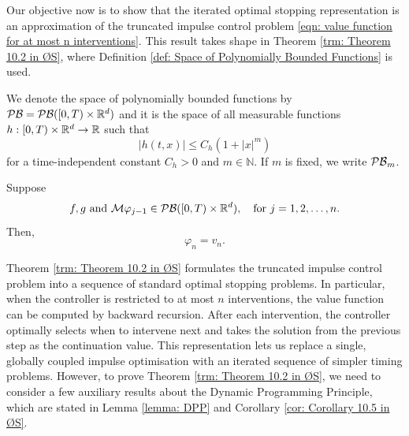 Our objective now is to show that the iterated optimal stopping representation is an approximation of the truncated impulse control problem \eqref{eqn: value function for at most n interventions}. This result takes shape in Theorem \ref{trm: Theorem 10.2 in ØS}, where Definition \ref{def: Space of Polynomially Bounded Functions} is used.

\begin{definition} 
\label{def: Space of Polynomially Bounded Functions}
    We denote the space of polynomially bounded functions by $\mathcal{PB} = \mathcal{PB}([0,T) \times \mathbb{R}^d)$ and it is the space of all measurable functions $h: [0,T) \times \mathbb{R}^d \rightarrow \mathbb{R}$ such that 
    \begin{equation*}
        |h(t,x)| \leq C_h(1+|x|^m)
    \end{equation*}
    for a time-independent constant $C_h>0$ and $m \in \mathbb N$. If $m$ is fixed, we write $\mathcal{PB}_m$. 
\end{definition}
\begin{theorem}
    \label{trm: Theorem 10.2 in ØS}
    Suppose 
    \begin{equation}
        f, g \text{ and } \mathcal{M} \varphi_{j-1} \in \mathcal{PB}([0,T) \times \mathbb{R}^d), \quad \text{for } j=1,2,\ldots,n.
        \label{eqn: (10.1.14) in ØS}
    \end{equation}
    Then, 
    \begin{equation*}
        \varphi_n = v_n.
    \end{equation*}
\end{theorem}

Theorem \ref{trm: Theorem 10.2 in ØS} formulates the truncated impulse control problem into a sequence of standard optimal stopping problems. In particular, when the controller is restricted to at most $n$ interventions, the value function can be computed by backward recursion. After each intervention, the controller optimally selects when to intervene next and takes the solution from the previous step as the continuation value. This representation lets us replace a single, globally coupled impulse optimisation with an iterated sequence of simpler timing problems. However, to prove Theorem \ref{trm: Theorem 10.2 in ØS}, we need to consider a few auxiliary results about the Dynamic Programming Principle, which are stated in Lemma \ref{lemma: DPP} and Corollary \ref{cor: Corollary 10.5 in ØS}. 

